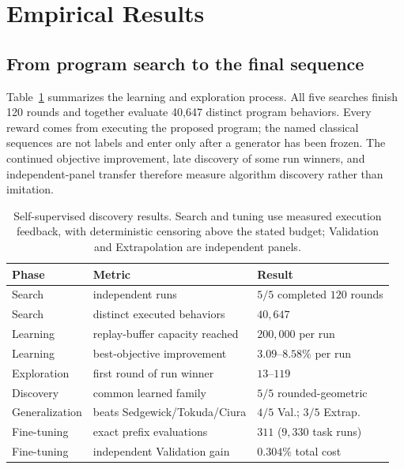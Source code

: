 \section{Empirical Results}
\label{sec:results}

\subsection{From program search to the final sequence}

Table~\ref{tab:discovery} summarizes the learning and exploration process.
All five searches finish 120 rounds and together evaluate 40,647 distinct
program behaviors.  Every reward comes from executing the proposed program;
the named classical sequences are not labels and enter only after a generator
has been frozen.  The continued objective improvement, late discovery of some
run winners, and independent-panel transfer therefore measure algorithm
discovery rather than imitation.

\begin{table}[ht]
  \centering
  \caption{Self-supervised discovery results.  Search and tuning use measured
  execution feedback, with deterministic censoring above the stated budget;
  Validation and Extrapolation are independent panels.}
  \label{tab:discovery}
  \begin{tabular}{lll}
    \toprule
    Phase & Metric & Result\\
    \midrule
    Search & independent runs & $5/5$ completed $120$ rounds\\
    Search & distinct executed behaviors & $40{,}647$\\
    Learning & replay-buffer capacity reached & $200{,}000$ per run\\
    Learning & best-objective improvement & $3.09$--$8.58\%$ per run\\
    Exploration & first round of run winner & $13$--$119$\\
    Discovery & common learned family & $5/5$ rounded-geometric\\
    Generalization & beats Sedgewick/Tokuda/Ciura & $4/5$ Val.; $3/5$ Extrap.\\
    Fine-tuning & exact prefix evaluations & $311$ ($9{,}330$ task runs)\\
    Fine-tuning & independent Validation gain & $0.304\%$ total cost\\
    \bottomrule
  \end{tabular}
\end{table}

